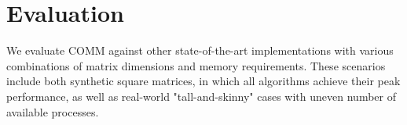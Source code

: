 \documentclass[sigplan,review,anonymous]{acmart}\settopmatter{printfolios=true,printccs=false,printacmref=false}
\newcommand\greg[1]{\textcolor{blue}{[Greg: #1]}}
\newcommand\mac[1]{\textcolor{red}{[Mac: #1]}}
\begin{document}
%

\section{Evaluation}
\label{sec:evaluation}

We evaluate COMM against other state-of-the-art implementations with various 
combinations of matrix dimensions and memory requirements. These scenarios 
include both synthetic square matrices, in which all algorithms achieve their 
peak performance, as well as real-world "tall-and-skinny" cases with uneven 
number of available processes. 
 
\end{document}
